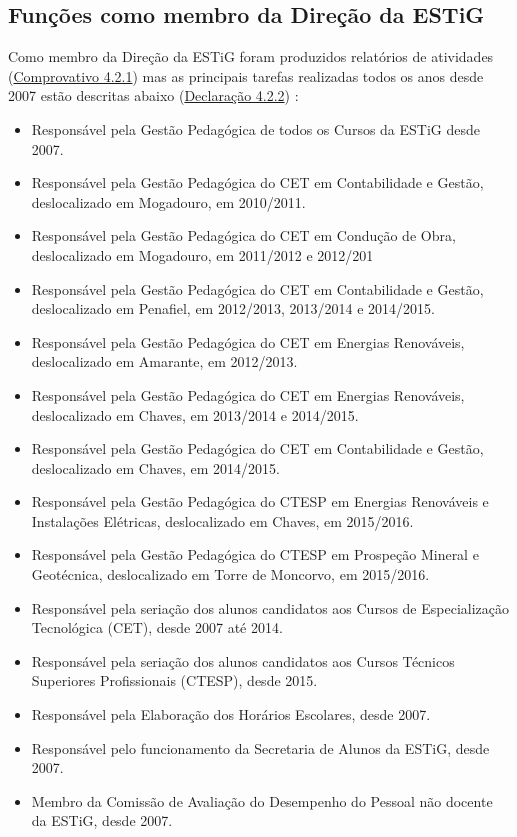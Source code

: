 \documentclass[11pt]{article}
\begin{document}
\subsection{Funções como membro da Direção da ESTiG}
Como membro da Direção da ESTiG foram produzidos relatórios de atividades (\href{run:MissaoIPBCargos/RelActividadesMJ.pdf}{Comprovativo 4.2.1}) mas as principais tarefas realizadas todos os anos desde 2007 estão descritas abaixo (\href{run:MissaoIPBCargos/tarefasSub.pdf}{Declaração 4.2.2}) :
\begin{itemize}
\item {Responsável pela Gestão Pedagógica de todos os Cursos da ESTiG desde 2007.}
\item {Responsável pela Gestão Pedagógica do CET em Contabilidade e Gestão, deslocalizado em Mogadouro, em 2010/2011.}
\item {Responsável pela Gestão Pedagógica do CET em Condução de Obra, deslocalizado em Mogadouro, em 2011/2012 e 2012/201}
\item {Responsável pela Gestão Pedagógica do CET em Contabilidade e Gestão, deslocalizado em Penafiel, em 2012/2013, 2013/2014 e 2014/2015.}
\item {Responsável pela Gestão Pedagógica do CET em Energias Renováveis, deslocalizado em Amarante, em 2012/2013.}
\item {Responsável pela Gestão Pedagógica do CET em Energias Renováveis, deslocalizado em Chaves, em 2013/2014 e 2014/2015.}
\item {Responsável pela Gestão Pedagógica do CET em Contabilidade e Gestão, deslocalizado em Chaves, em 2014/2015.}
\item {Responsável pela Gestão Pedagógica do CTESP em Energias Renováveis e Instalações Elétricas, deslocalizado em Chaves, em 2015/2016.}
\item {Responsável pela Gestão Pedagógica do CTESP em Prospeção Mineral e Geotécnica, deslocalizado em Torre de Moncorvo, em 2015/2016.}
\item {Responsável pela seriação dos alunos candidatos aos Cursos de Especialização Tecnológica (CET), desde 2007 até 2014.}
\item {Responsável pela seriação dos alunos candidatos aos Cursos Técnicos Superiores Profissionais (CTESP), desde 2015. }
\item {Responsável pela Elaboração dos Horários Escolares, desde 2007. }
\item {Responsável pelo funcionamento da Secretaria de Alunos da ESTiG, desde 2007. }
\item {Membro da Comissão de Avaliação do Desempenho do Pessoal não docente da ESTiG, desde 2007. }

\end{itemize}
\end{document}
